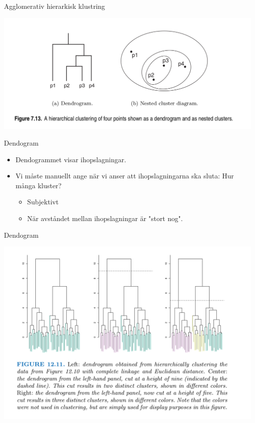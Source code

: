 \documentclass[10pt,english]{beamer}
\begin{document}
\begin{frame}{Agglomerativ hierarkisk klustring}

    \includegraphics[width = \textwidth]{figs/dendogram2.png}
    
\end{frame}

\begin{frame}{Dendogram}

    \begin{itemize}
        \item Dendogrammet visar  ihopslagningar.
        \item Vi måste manuellt ange när vi anser att ihopslagningarna ska sluta: Hur många kluster?
        \begin{itemize}
            \item Subjektivt
            \item När avståndet mellan ihopslagningar är "stort nog".
        \end{itemize}
    \end{itemize}
    
\end{frame}

\begin{frame}{Dendogram}

    \includegraphics[width=\textwidth]{figs/dendogram3.png}
    
\end{frame}
\end{document}
